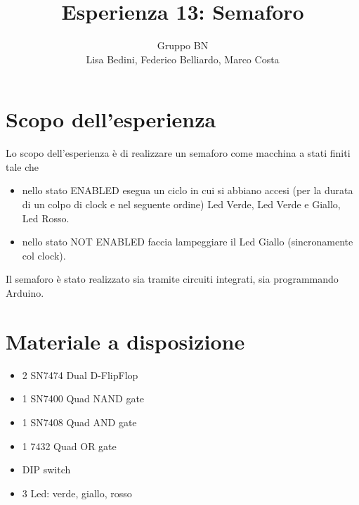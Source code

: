 \documentclass[10pt,a4paper]{article}
\author{Gruppo BN \\Lisa Bedini,  Federico Belliardo, Marco Costa}
\title{Esperienza 13: Semaforo}
\begin{document}
\maketitle


\section{Scopo dell'esperienza}
Lo scopo dell'esperienza è di realizzare un semaforo come macchina a stati finiti tale che
\begin{itemize}
\item nello stato ENABLED esegua un ciclo in cui si abbiano accesi (per la durata di un colpo di clock e nel seguente ordine) Led Verde, Led Verde e Giallo, Led Rosso.
\item nello stato NOT ENABLED faccia lampeggiare il Led Giallo (sincronamente  col clock).
\end{itemize}
Il semaforo è stato realizzato sia tramite circuiti integrati, sia programmando Arduino.

\section{Materiale a disposizione}
\begin{itemize}
\item 2 SN7474 Dual D-FlipFlop
\item 1 SN7400 Quad NAND gate
\item 1 SN7408 Quad AND gate
\item 1 7432 Quad OR gate
\item DIP switch
\item 3 Led: verde, giallo, rosso
\end{itemize}
\end{document}
